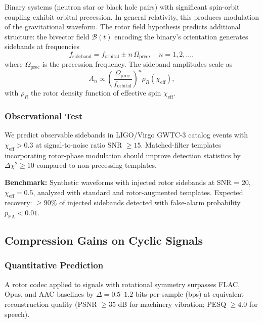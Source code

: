 \documentclass[11pt,a4paper]{article}
\newcommand{\Biv}{\mathcal{B}}
\theoremstyle{definition}
\theoremstyle{plain}
\theoremstyle{remark}
\begin{document}
Binary systems (neutron star or black hole pairs) with significant spin-orbit coupling exhibit orbital precession. In general relativity, this produces modulation of the gravitational waveform. The rotor field hypothesis predicts additional structure: the bivector field $\Biv(t)$ encoding the binary's orientation generates sidebands at frequencies
\begin{equation}
f_{\text{sideband}} = f_{\text{orbital}} \pm n\,\Omega_{\text{prec}}, \quad n=1,2,\ldots,
\end{equation}
where $\Omega_{\text{prec}}$ is the precession frequency. The sideband amplitudes scale as
\begin{equation}
A_n \propto \left(\frac{\Omega_{\text{prec}}}{f_{\text{orbital}}}\right)^n \rho_R(\chi_{\text{eff}}),
\end{equation}
with $\rho_R$ the rotor density function of effective spin $\chi_{\text{eff}}$.

\subsubsection{Observational Test}

We predict observable sidebands in LIGO/Virgo GWTC-3 catalog events with $\chi_{\text{eff}} > 0.3$ at signal-to-noise ratio SNR $\geq 15$. Matched-filter templates incorporating rotor-phase modulation should improve detection statistics by $\Delta\chi^2 \geq 10$ compared to non-precessing templates.

\textbf{Benchmark:} Synthetic waveforms with injected rotor sidebands at SNR = 20, $\chi_{\text{eff}} = 0.5$, analyzed with standard and rotor-augmented templates. Expected recovery: $\geq 90\%$ of injected sidebands detected with false-alarm probability $p_{\text{FA}} < 0.01$.

\subsection{Compression Gains on Cyclic Signals}

\subsubsection{Quantitative Prediction}

A rotor codec applied to signals with rotational symmetry surpasses FLAC, Opus, and AAC baselines by $\Delta = 0.5$--$1.2$ bits-per-sample (bps) at equivalent reconstruction quality (PSNR $\geq 35$ dB for machinery vibration; PESQ $\geq 4.0$ for speech).
\end{document}
